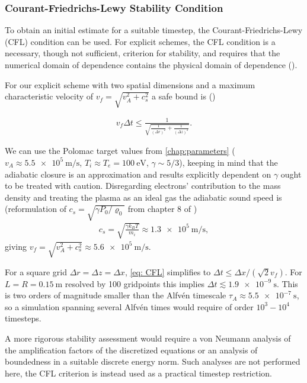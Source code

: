 \subsubsection{Courant-Friedrichs-Lewy Stability Condition}

To obtain an initial estimate for a suitable timestep, the
Courant-Friedrichs-Lewy (CFL) condition can be used. For explicit
schemes, the CFL condition is a necessary, though not sufficient,
criterion for stability, and requires that the numerical domain of
dependence contains the physical domain of dependence (\cite{leveque2002}).

For our explicit scheme with two spatial dimensions and a maximum
characteristic velocity of $v_f = \sqrt{v_A^2+c_s^2}$ a safe bound is (\cite{Inan2011})

\begin{align}
    \label{eq: CFL}
    v_f \Delta t \leq \frac{1}{\sqrt{\frac{1}{(\Delta r)^2} + \frac{1}{(\Delta z)^2}}}.
\end{align}


We can use the Polomac target values from \autoref{chap:parameters} ($v_A \approx \SI{5.5e5}{\meter\per\second}$,
$T_i \approx T_e = \SI{100}{\electronvolt}$, $\gamma \sim 5/3$), keeping in
mind that the adiabatic closure is an approximation and results explicitly dependent
on $\gamma$ ought to be treated with caution. Disregarding electrons'
contribution to the mass density and treating the plasma as an ideal gas the adiabatic sound
speed is (reformulation of $c_s = \sqrt{\gamma P_0/\varrho_0}$ from chapter 8 of \cite{Freidberg2014})
\begin{align*}
    c_s = \sqrt{\frac{\gamma k_B T}{m_i}} \approx \SI{1.3e5}{\meter \per \second},
\end{align*}
giving $v_f = \sqrt{v_A^2+c_s^2} \approx \SI{5.6e5}{\meter \per \second}$.

For a square grid $\Delta r = \Delta z = \Delta x$, \eqref{eq: CFL} simplifies to
$\Delta t \leq \Delta x/(\sqrt{2}v_f)$.
For $L=R=\SI{0.15}{\meter}$ resolved by 100 gridpoints this implies $\Delta t\lesssim \SI{1.9e-9}{\second}$.
This is two orders of magnitude smaller than the Alfv\'{e}n timescale
$\tau_A \approx \SI{5.5e-7}{\second}$, so a simulation spanning several
Alfv\'{e}n times would require of order $10^3-10^4$ timesteps.

A more rigorous stability assessment would require a von Neumann analysis
of the amplification factors of the discretized equations or an analysis
of boundedness in a suitable discrete energy norm. Such analyses are not
performed here, the CFL criterion is instead used as a practical timestep
restriction.

